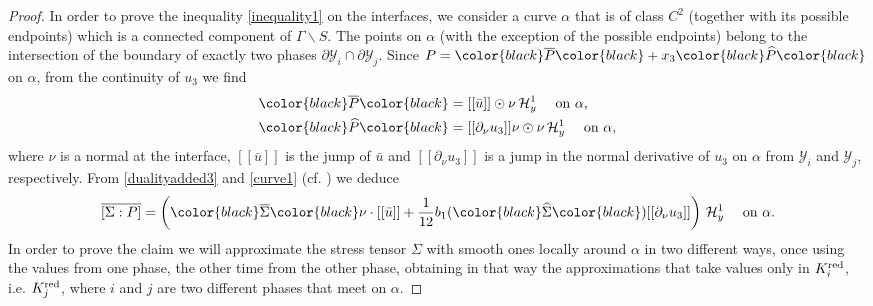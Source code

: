 \documentclass[reqno,10pt]{amsart}
\numberwithin{equation}{section}
\theoremstyle{remark}
\newcommand{\BLACK}{\color{black}}
\newcommand{\PINK}{\color{black}}
\newcommand{\calH}{\mathcal{H}}
\newcommand{\calY}{\mathcal{Y}}
\newcommand{\zerothI}[1]{\overline{#1}}
\newcommand{\firstI}[1]{\widehat{#1}}
\begin{document}
\begin{proof}
In order to prove the inequality \eqref{inequality1} on the interfaces, we consider a curve $\alpha$ that is of class $C^2$ (together with its possible endpoints) which is a connected component of $\Gamma \backslash S$. 
The points on $\alpha$ (with the exception of the possible endpoints) belong to the intersection of the boundary of exactly two phases $\partial \calY_i \cap \partial \calY_j$.
Since $P = {\PINK\zerothI{P}\BLACK} +x_3 {\PINK\firstI{P}\BLACK}$ on $\alpha$, from the continuity of $u_3$ we find 
\begin{align}
	\label{bar P on curve alpha} & {\PINK\zerothI{P}\BLACK} = [[\bar{u}]] \odot \nu \,\calH^{1}_{y} \quad \textrm{ on } \alpha, 
	\\\label{hat P on curve alpha} & {\PINK\firstI{P}\BLACK} = [[\partial_{\nu}u_3]] \nu \odot \nu \,\calH^{1}_{y} \quad \textrm{ on } \alpha,
\end{align}
where $\nu$ is a normal at the interface, $[[\bar{u}]]$ is the jump of $\bar{u}$ and $[[\partial_{\nu}u_3]]$ is a jump in the normal derivative of $u_3$ on $\alpha$ from $\calY_i$ and $\calY_j$, respectively. 
From \eqref{dualityadded3} and \eqref{curve1} (cf. ) we deduce 
\begin{equation} 
\label{dualcurve} 
	\zerothI{[\Sigma:P]} = \left( {\PINK\zerothI{\Sigma}\BLACK}\nu \cdot [[\bar{u}]] + \frac{1}{12} b_1({\PINK\firstI{\Sigma}\BLACK}) [[\partial_{\nu}u_3]] \right) \,\calH^{1}_{y} \quad \textrm{ on } \alpha. 
\end{equation}
In order to prove the claim we will approximate the stress tensor $\Sigma$ with smooth ones locally around $\alpha$ in two different ways, once using the values from one phase, the other time from the other phase, obtaining in that way the approximations that take values only in $K^{\rm red}_i$, i.e. $K^{\rm red}_j$, where $i$ and $j$ are two different phases that meet on $\alpha$. 


\end{proof}
\end{document}
